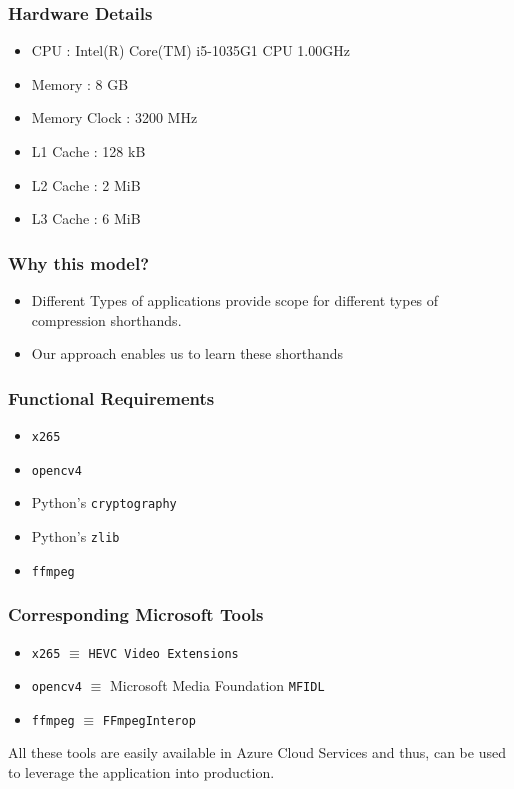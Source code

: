 \documentclass{beamer}
\begin{document}
\begin{frame}
    \frametitle{Hardware Details}
    \begin{itemize}
        \item CPU : Intel(R) Core(TM) i5-1035G1 CPU \@ 1.00GHz

        \item Memory : 8 GB
        \item Memory Clock : 3200 MHz
        \item L1 Cache : 128 kB
        \item L2 Cache : 2 MiB
        \item L3 Cache : 6 MiB
    \end{itemize}
\end{frame}

\begin{frame}
    \frametitle{Why this model?}
    \begin{itemize}
        \item Different Types of applications provide scope for different types of compression shorthands.
        \pause
        \item Our approach enables us to learn these shorthands
    \end{itemize}
\end{frame}

\begin{frame}
    \frametitle{Functional Requirements}
    \begin{itemize}
        \item \texttt{x265}
        \item \texttt{opencv4}
        \item Python's \texttt{cryptography}
        \item Python's \texttt{zlib}
        \item \texttt{ffmpeg}
    \end{itemize}
\end{frame}


\begin{frame}
    \frametitle{Corresponding Microsoft Tools}
    \begin{itemize}
        \item \texttt{x265} $\equiv$ \texttt{HEVC Video Extensions}
        \pause
        \item \texttt{opencv4} $\equiv$ Microsoft Media Foundation \texttt{MFIDL}
        \pause
        \item \texttt{ffmpeg} $\equiv$ \texttt{FFmpegInterop}
    \end{itemize}
    \pause
    All these tools are easily available in Azure Cloud Services and thus, can be used to leverage the application into production.
\end{frame}
\end{document}
